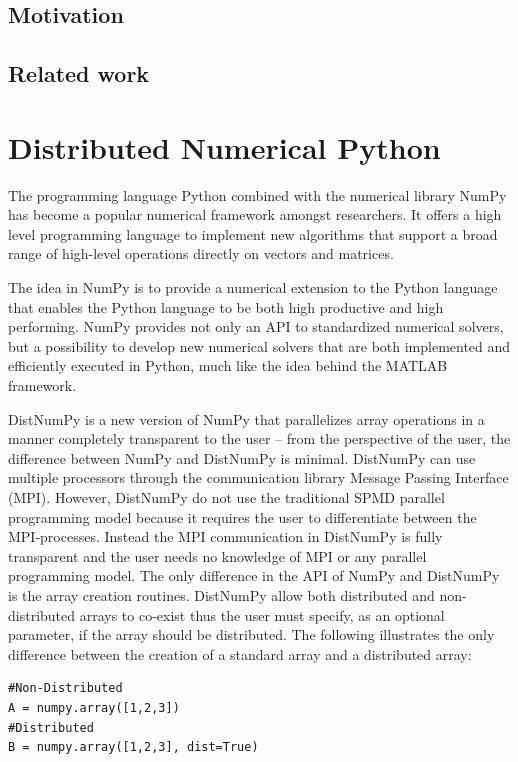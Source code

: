 \documentclass[preprint]{../PGAS10/sigplanconf}
\begin{document}
\subsection{Motivation}
\subsection{Related work}

\section{Distributed Numerical Python}
The programming language Python combined with the numerical library NumPy\cite{numpy} has become a popular numerical framework amongst researchers. It offers a high level programming language to implement new algorithms that support a broad range of high-level operations directly on vectors and matrices.

The idea in NumPy is to provide a numerical extension to the Python language that enables the Python language to be both high productive and high performing. NumPy provides not only an API to standardized numerical solvers, but a possibility to develop new numerical solvers that are both implemented and efficiently executed in Python, much like the idea behind the MATLAB\cite{guide1998mathworks} framework. 

DistNumPy is a new version of NumPy that parallelizes array operations in a manner completely transparent to the user -- from the perspective of the user, the difference between NumPy and DistNumPy is minimal. DistNumPy can use multiple processors through the communication library Message Passing Interface (MPI)\cite{mpi}. However, DistNumPy do not use the traditional SPMD parallel programming model because it requires the user to differentiate between the MPI-processes. Instead the MPI communication in DistNumPy is fully transparent and the user needs no knowledge of MPI or any parallel programming model. 
The only difference in the API of NumPy and DistNumPy is the array creation routines. DistNumPy allow both distributed and non-distributed arrays to co-exist thus the user must specify, as an optional parameter, if the array should be distributed. The following illustrates the only difference between the creation of a standard array and a distributed array:
\lstset{frame=none, xleftmargin=0mm, numbers=none}
\begin{lstlisting}
#Non-Distributed
A = numpy.array([1,2,3])
#Distributed
B = numpy.array([1,2,3], dist=True)
\end{lstlisting}
\lstset{frame=single, xleftmargin=5mm, numbers=left}
\end{document}
